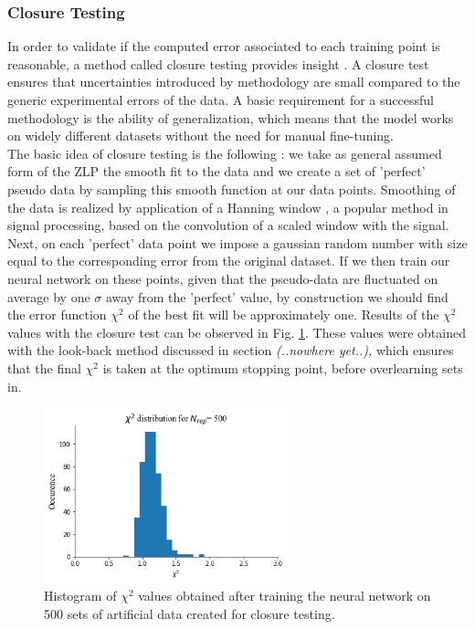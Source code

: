 \subsubsection*{Closure Testing}
In order to validate if the computed error associated to each training point is reasonable, a method called closure testing provides insight \cite{Ball:2015oha}. A closure test ensures that uncertainties introduced by methodology are small compared to the generic experimental errors of the data. A basic requirement for a successful methodology is the ability of generalization, which means that the model works on widely different datasets without the need for manual fine-tuning.\\
The basic idea of closure testing is the following \cite{Ball:2015oha}: we take as general assumed form of the ZLP the smooth fit to the data and we create a set of 'perfect' pseudo data by sampling this smooth function at our data points. Smoothing of the data is realized by application of a Hanning window \cite{Essenwanger:1986}, a popular method in signal processing, based on the convolution of a scaled window with the signal. \\
Next, on each 'perfect' data point we impose a gaussian random number with size equal to the corresponding error from the original dataset. If we then train our neural network on these points, given that the pseudo-data are fluctuated on average by one $\sigma$ away from the 'perfect' value, by construction we should find the error function $\chi^2$ of the best fit will be approximately one. Results of the $\chi^2$ values with the closure test can be observed in Fig. \ref{closure1}. These values were obtained with the look-back method discussed in section \textit{ (..nowhere yet..),} which ensures that the final $\chi^2$ is taken at the optimum stopping point, before overlearning sets in.

\begin{figure}[H]
    \centering
    \includegraphics[width=70mm]{plots/chi2.png}
    \caption{Histogram of $\chi^2$ values obtained after training the neural network on 500 sets of artificial data created for closure testing.}
    \label{closure1}
\end{figure}


